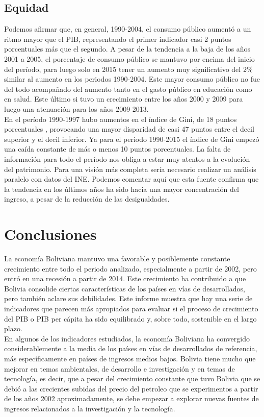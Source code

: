     \subsection{Equidad}
    Podemos afirmar que, en general, 1990-2004, el consumo público aumentó a un ritmo mayor que el PIB, representando el primer indicador casi 2 puntos porcentuales más que el segundo. A pesar de la tendencia a la baja de los años 2001 a 2005, el porcentaje de consumo público se mantuvo por encima del inicio del período, para luego solo en 2015 tener un aumento muy significativo del 2\% similar al aumento en los periodos 1990-2004. Este mayor consumo público no fue del todo acompañado del aumento tanto en el gasto público en educación como en salud. Este último si tuvo un crecimiento entre los años 2000 y 2009 para luego una atenuación para los años 2009-2013.\\
    En el período 1990-1997 hubo aumentos en el índice de Gini, de 18 puntos porcentuales , provocando una mayor disparidad de casi 47 puntos entre el decil superior y el decil inferior. Ya para el periodo 1990-2015 el índice de Gini empezó una caída constante de más o menos 10 puntos porcentuales. La falta de información para todo el período nos obliga a estar muy atentos a la evolución del patrimonio. Para una visión más completa sería necesario realizar un análisis paralelo con datos del INE. Podemos comentar aquí que esta fuente confirma que la tendencia en los últimos años ha sido hacia una mayor concentración del ingreso, a pesar de la reducción de las desigualdades.

    \section{Conclusiones}	
    La economía Boliviana mantuvo una favorable y posiblemente constante crecimiento entre todo el periodo analizado, especialmente a partir de 2002, pero entró en una recesión a partir de 2014. Este crecimiento ha contribuido a que Bolivia consolide ciertas características de los países en vías de desarrollados, pero también aclare sus debilidades. Este informe muestra que hay una serie de indicadores que parecen más apropiados para evaluar si el proceso de crecimiento del PIB o PIB per cápita ha sido equilibrado y, sobre todo, sostenible en el largo plazo. \\
    En algunos de los indicadores estudiados, la economía Boliviana ha convergido considerablemente a la media de los países en vías de desarrollados de referencia, más específicamente en países de ingresos medios bajos. Bolivia tiene mucho que mejorar en temas ambientales, de desarrollo e investigación y en temas de tecnología, es decir, que a pesar del crecimiento constante que tuvo Bolivia que se debió a las crecientes subidas del precio del petroleo que se experimentos a partir de los años 2002 aproximadamente, se debe empezar a explorar nuevas fuentes de ingresos relacionados a la investigación y la tecnología.


